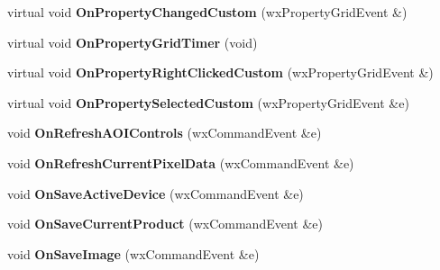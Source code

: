 \begin{DoxyCompactItemize}
\item 
\hypertarget{class_prop_view_frame_aeff700242ec7699cbbccfefe11ddd1b7}{virtual void {\bfseries On\+Property\+Changed\+Custom} (wx\+Property\+Grid\+Event \&)}\label{class_prop_view_frame_aeff700242ec7699cbbccfefe11ddd1b7}

\item 
\hypertarget{class_prop_view_frame_a7349c43b3e6d12d07966a96b9d99cde3}{virtual void {\bfseries On\+Property\+Grid\+Timer} (void)}\label{class_prop_view_frame_a7349c43b3e6d12d07966a96b9d99cde3}

\item 
\hypertarget{class_prop_view_frame_a31b5451804902180df7656ab9a92018f}{virtual void {\bfseries On\+Property\+Right\+Clicked\+Custom} (wx\+Property\+Grid\+Event \&)}\label{class_prop_view_frame_a31b5451804902180df7656ab9a92018f}

\item 
\hypertarget{class_prop_view_frame_af2923446c7b70d742ec58f0476d2029d}{virtual void {\bfseries On\+Property\+Selected\+Custom} (wx\+Property\+Grid\+Event \&e)}\label{class_prop_view_frame_af2923446c7b70d742ec58f0476d2029d}

\item 
\hypertarget{class_prop_view_frame_a16f4486de6369aea4d339ce0015e89da}{void {\bfseries On\+Refresh\+A\+O\+I\+Controls} (wx\+Command\+Event \&e)}\label{class_prop_view_frame_a16f4486de6369aea4d339ce0015e89da}

\item 
\hypertarget{class_prop_view_frame_a508aac7e62316b56f43041b15e1ff5cb}{void {\bfseries On\+Refresh\+Current\+Pixel\+Data} (wx\+Command\+Event \&e)}\label{class_prop_view_frame_a508aac7e62316b56f43041b15e1ff5cb}

\item 
\hypertarget{class_prop_view_frame_acde3a05d51436429c9ca6cb84fa2c700}{void {\bfseries On\+Save\+Active\+Device} (wx\+Command\+Event \&e)}\label{class_prop_view_frame_acde3a05d51436429c9ca6cb84fa2c700}

\item 
\hypertarget{class_prop_view_frame_ae69a3e94a3fddf52b52e44cb1d3aa6e4}{void {\bfseries On\+Save\+Current\+Product} (wx\+Command\+Event \&e)}\label{class_prop_view_frame_ae69a3e94a3fddf52b52e44cb1d3aa6e4}

\item 
\hypertarget{class_prop_view_frame_a8c836d8eac4fc42f6169252dcb91cf28}{void {\bfseries On\+Save\+Image} (wx\+Command\+Event \&e)}\label{class_prop_view_frame_a8c836d8eac4fc42f6169252dcb91cf28}


\end{DoxyCompactItemize}
